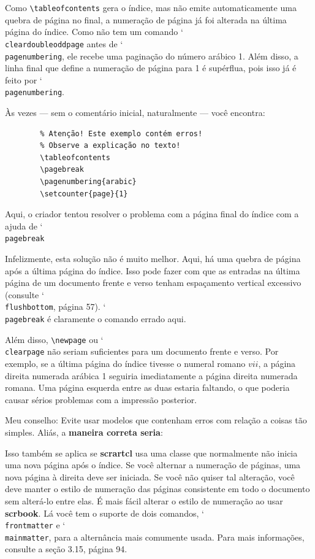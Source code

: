Como \verb|\tableofcontents| gera o índice, mas não emite automaticamente uma quebra de página no final, a numeração de página já foi alterada na última página do índice. Como não tem um comando \char`\\\texttt{clear\-dou\-ble\-odd\-pa\-ge} antes de \char`\\\texttt{pa\-ge\-num\-be\-ring}, ele recebe uma paginação do número arábico 1. Além disso, a linha final que define a numeração de página para 1 é supérflua, pois isso já é feito por \char`\\\texttt{pa\-ge\-num\-be\-ring}.

Às vezes --- sem o comentário inicial, naturalmente --- você encontra:
\begin{verbatim}
        % Atenção! Este exemplo contém erros!
        % Observe a explicação no texto!
        \tableofcontents
        \pagebreak
        \pagenumbering{arabic}
        \setcounter{page}{1}
\end{verbatim}

Aqui, o criador tentou resolver o problema com a página final do índice com a ajuda de \char`\\\texttt{pa\-ge\-break}

Infelizmente, esta solução não é muito melhor. Aqui, há uma quebra de página após a última página do índice. Isso pode fazer com que as entradas na última página de um documento frente e verso tenham espaçamento vertical excessivo (consulte \char`\\\texttt{flush\-bot\-tom}, página 57). \char`\\\texttt{pa\-ge\-break} é claramente o comando errado aqui.

Além disso, \verb|\newpage| ou \char`\\\texttt{clear\-pa\-ge} não seriam suficientes para um documento frente e verso. Por exemplo, se a última página do índice tivesse o numeral romano $vii$, a página direita numerada arábica 1 seguiria imediatamente a página direita numerada romana. Uma página esquerda entre as duas estaria faltando, o que poderia causar sérios problemas com a impressão posterior.

Meu conselho: Evite usar modelos que contenham erros com relação a coisas tão simples. Aliás, a \textbf{maneira correta seria}:
\begin{verbnobox}[\hspace{1.5in}]
    \tableofcontents
    \cleardoubleoddpage
\end{verbnobox}

Isso também se aplica se \textbf{scrartcl} usa uma classe que normalmente não inicia uma nova página após o índice. Se você alternar a numeração de páginas, uma nova página à direita deve ser iniciada. Se você não quiser tal alteração, você deve manter o estilo de numeração das páginas consistente em todo o documento sem alterá-lo entre elas. É mais fácil alterar o estilo de numeração ao usar \textbf{scrbook}. Lá você tem o suporte de dois comandos, \char`\\\texttt{front\-matter} e \char`\\\texttt{main\-matter}, para a alternância mais comumente usada. Para mais informações, consulte a seção 3.15, página 94.
